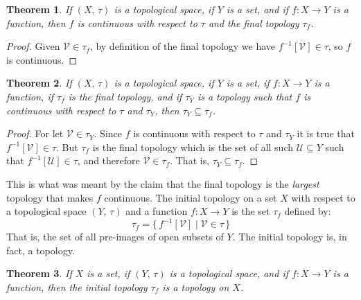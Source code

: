 \documentclass{article}
\theoremstyle{plain}
\newtheorem{theorem}{Theorem}[section]
\theoremstyle{normal}
\newenvironment{definition}{%
    \pushQED{\qed}\renewcommand{\qedsymbol}{$\blacksquare$}\definitionx%
}{%
    \popQED\enddefinitionx%
}
\begin{document}
        \begin{theorem}
            If $(X,\,\tau)$ is a topological space, if $Y$ is a set, and if
            $f:X\rightarrow{Y}$ is a function, then $f$ is continuous with
            respect to $\tau$ and the final topology $\tau_{f}$.
        \end{theorem}
        \begin{proof}
            Given $\mathcal{V}\in\tau_{f}$, by definition of the final topology
            we have $f^{-1}[\mathcal{V}]\in\tau$, so $f$ is continuous.
        \end{proof}
        \begin{theorem}
            If $(X,\,\tau)$ is a topological space, if $Y$ is a set, if
            $f:X\rightarrow{Y}$ is a function, if $\tau_{f}$ is the final
            topology, and if $\tau_{Y}$ is a topology such that
            $f$ is continuous with respect to $\tau$ and $\tau_{Y}$, then
            $\tau_{Y}\subseteq\tau_{f}$.
        \end{theorem}
        \begin{proof}
            For let $\mathcal{V}\in\tau_{Y}$. Since $f$ is continuous with
            respect to $\tau$ and $\tau_{Y}$ it is true that
            $f^{-1}[\mathcal{V}]\in\tau$. But $\tau_{f}$ is the final topology
            which is the set of all such $\mathcal{U}\subseteq{Y}$ such that
            $f^{-1}[\mathcal{U}]\in\tau$, and therefore
            $\mathcal{V}\in\tau_{f}$. That is, $\tau_{Y}\subseteq\tau_{f}$.
        \end{proof}
        This is what was meant by the claim that the final topology is the
        \textit{largest} topology that makes $f$ continuous.
        \begin{definition}[\textbf{Initial Topology}]
            The initial topology on a set $X$ with respect to a topological
            space $(Y,\,\tau)$ and a function $f:X\rightarrow{Y}$ is the
            set $\tau_{f}$ defined by:
            \begin{equation}
                \tau_{f}=\{\,f^{-1}[\mathcal{V}]\;|\;\mathcal{V}\in\tau\,\}
            \end{equation}
            That is, the set of all pre-images of open subsets of $Y$.
        \end{definition}
        The initial topology is, in fact, a topology.
        \begin{theorem}
            If $X$ is a set, if $(Y,\,\tau)$ is a topological space, and if
            $f:X\rightarrow{Y}$ is a function, then the initial topology
            $\tau_{f}$ is a topology on $X$.
        \end{theorem}
\end{document}
